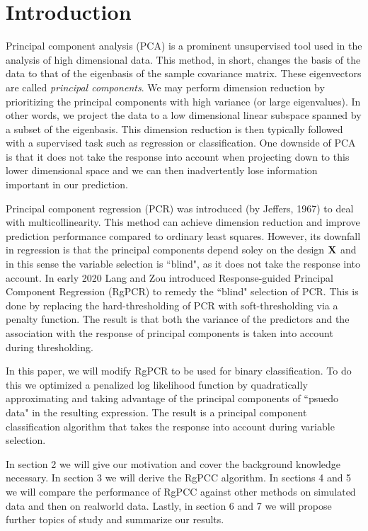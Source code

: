 \documentclass[main.tex]{subfiles}
\begin{document}
\section{Introduction}
Principal component analysis (PCA) is a prominent unsupervised tool used in the analysis of high dimensional data. This method, in short, changes the basis of the data to that of the eigenbasis of the sample covariance matrix. These eigenvectors are called \emph{principal components}. We may perform dimension reduction by prioritizing the principal components with high variance (or large eigenvalues). In other words, we project the data to a low dimensional linear subspace spanned by a subset of the eigenbasis. This dimension reduction is then typically followed with a supervised task such as regression or classification. One downside of PCA is that it does not take the response into account when projecting down to this lower dimensional space and we can then inadvertently lose information important in our prediction. 

Principal component regression (PCR) was introduced (by Jeffers, 1967) to deal with multicollinearity. This method can achieve dimension reduction and improve prediction performance compared to ordinary least squares. However, its downfall in regression is that the principal components depend soley on the design $\mathbf{X}$ and in this sense the variable selection is ``blind", as it does not take the response into account. In early 2020 Lang and Zou \cite{langzou} introduced Response-guided Principal Component Regression (RgPCR) to remedy the ``blind" selection of PCR. This is done by replacing the hard-thresholding of PCR with soft-thresholding via a penalty function. The result is that both the variance of the predictors and the association with the response of principal components is taken into account during thresholding.


In this paper, we will modify RgPCR to be used for binary classification. To do this we optimized a penalized log likelihood function by quadratically approximating and taking advantage of the principal components of ``psuedo data" in the resulting expression. The result is a principal component classification algorithm that takes the response into account during variable selection.

In section 2 we will give our motivation and cover the background knowledge necessary. In section 3 we will derive the RgPCC algorithm. In sections 4 and 5 we will compare the performance of RgPCC against other methods on simulated data and then on realworld data. Lastly, in section 6 and 7 we will propose further topics of study and summarize our results.
\end{document}
